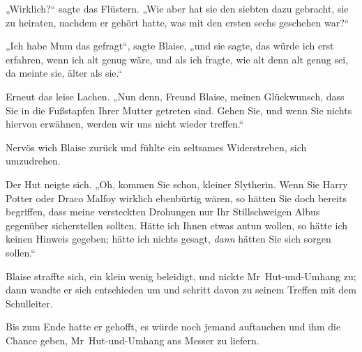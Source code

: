 „Wirklich?“ sagte das Flüstern.
„Wie aber hat sie den siebten dazu gebracht, sie zu heiraten, nachdem er gehört hatte, was mit den ersten sechs geschehen war?“

„Ich habe Mum das gefragt“, sagte Blaise, „und sie sagte, das würde ich erst erfahren, wenn ich alt genug wäre, und als ich fragte, wie alt denn alt genug sei, da meinte sie, älter als sie.“

Erneut das leise Lachen.
„Nun denn, Freund Blaise, meinen Glückwunsch, dass Sie in die Fußstapfen Ihrer Mutter getreten sind. Gehen Sie, und wenn Sie nichts hiervon erwähnen, werden wir uns nicht wieder treffen.“

Nervös wich Blaise zurück und fühlte ein seltsames Widerstreben, sich umzudrehen.

Der Hut neigte sich.
„Oh, kommen Sie schon, kleiner Slytherin. Wenn Sie Harry Potter oder Draco Malfoy wirklich ebenbürtig wären, so hätten Sie doch bereits begriffen, dass meine versteckten Drohungen nur Ihr Stillschweigen Albus gegenüber sicherstellen sollten. Hätte ich Ihnen etwas antun wollen, so hätte ich keinen Hinweis gegeben; hätte ich nichts gesagt, \emph{dann} hätten Sie sich sorgen sollen.“

Blaise straffte sich, ein klein wenig beleidigt, und nickte Mr~Hut-und-Umhang zu; dann wandte er sich entschieden um und schritt davon zu seinem Treffen mit dem Schulleiter.

Bis zum Ende hatte er gehofft, es würde noch jemand auftauchen und ihm die Chance geben, Mr~Hut-und-Umhang ans Messer zu liefern.

